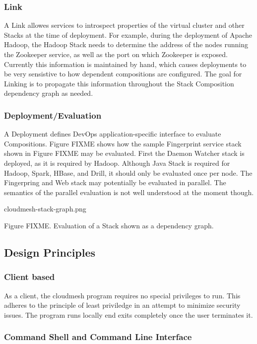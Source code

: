 \documentclass[9pt,twocolumn,twoside]{styles/osajnl}
\begin{document}
\subsubsection{Link}

A Link allowes services to introspect properties of the virtual cluster and other Stacks at the time of deployment. For example, during the deployment of Apache Hadoop, the Hadoop Stack needs to determine the address of the nodes running the Zookeeper service, as well as the port on which Zookeeper is exposed. Currently this information is maintained by hand, which causes deployments to be very sensistive to how dependent compositions are configured. The goal for Linking is to propagate this information throughout the Stack Composition dependency graph as needed.


\subsubsection{Deployment/Evaluation}

A Deployment defines DevOps application-specific interface to evaluate Compositions.
Figure FIXME shows how the sample Fingerprint service stack shown in Figure FIXME may be evaluated. First the Daemon Watcher stack is deployed, as it is required by Hadoop. Although Java Stack is required for Hadoop, Spark, HBase, and Drill, it should only be evaluated once per node. The Fingerpring and Web stack may potentially be evaluated in parallel. The semantics of the parallel evaluation is not well understood at the moment though.


 cloudmesh-stack-graph.png 

Figure FIXME. Evaluation of a Stack shown as a dependency graph.


\subsection{Design Principles}

\subsubsection{Client based}

As a client, the cloudmesh program requires no special privileges to run. This adheres to the principle of least priviledge in an attempt to minimize security issues. The program runs locally end exits completely once the user terminates it.


\subsubsection{Command Shell and Command Line Interface}
\end{document}
